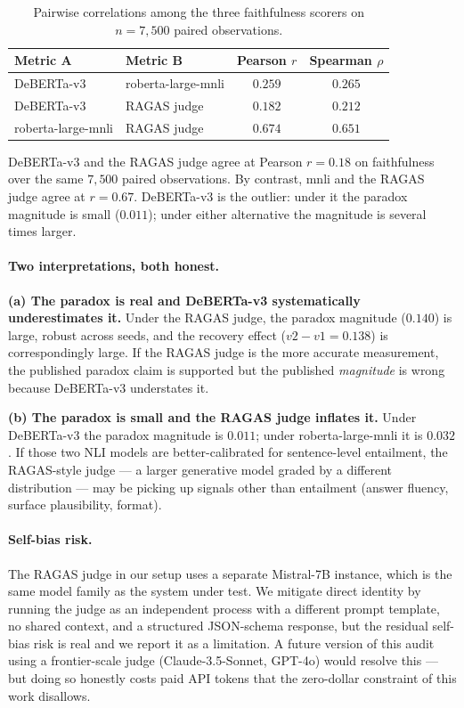 \begin{table}[H]
\centering
\small
\caption{Pairwise correlations among the three faithfulness
scorers on $n{=}7{,}500$ paired observations.}
\label{tab:multimetric-corr}
\begin{tabular}{llcc}
\toprule
Metric A & Metric B & Pearson $r$ & Spearman $\rho$ \\
\midrule
DeBERTa-v3 & roberta-large-mnli & $0.259$ & $0.265$ \\
DeBERTa-v3 & RAGAS judge        & $\mathbf{0.182}$ & $0.212$ \\
roberta-large-mnli & RAGAS judge & $0.674$ & $0.651$ \\
\bottomrule
\end{tabular}
\end{table}

DeBERTa-v3 and the RAGAS judge agree at Pearson $r=0.18$ on
faithfulness over the same $7{,}500$ paired observations. By
contrast, mnli and the RAGAS judge agree at $r=0.67$. DeBERTa-v3
is the outlier: under it the paradox magnitude is small
($0.011$); under either alternative the magnitude is several times
larger.

\paragraph{Two interpretations, both honest.}
\textbf{(a) The paradox is real and DeBERTa-v3 systematically
underestimates it.} Under the RAGAS judge, the paradox magnitude
($0.140$) is large, robust across seeds, and the recovery effect
($v2 - v1 = 0.138$) is correspondingly large. If the RAGAS judge is
the more accurate measurement, the published paradox claim is
supported but the published \emph{magnitude} is wrong because
DeBERTa-v3 understates it.

\textbf{(b) The paradox is small and the RAGAS judge inflates it.}
Under DeBERTa-v3 the paradox magnitude is $0.011$; under
roberta-large-mnli it is $0.032$. If those two NLI models are
better-calibrated for sentence-level entailment, the RAGAS-style
judge --- a larger generative model graded by a different
distribution --- may be picking up signals other than entailment
(answer fluency, surface plausibility, format).

\paragraph{Self-bias risk.}
The RAGAS judge in our setup uses a separate Mistral-7B instance,
which is the same model family as the system under test. We mitigate
direct identity by running the judge as an independent process with
a different prompt template, no shared context, and a structured
JSON-schema response, but the residual self-bias risk is real and
we report it as a limitation. A future version of this audit using
a frontier-scale judge (Claude-3.5-Sonnet, GPT-4o) would resolve
this --- but doing so honestly costs paid API tokens that the
zero-dollar constraint of this work disallows.

